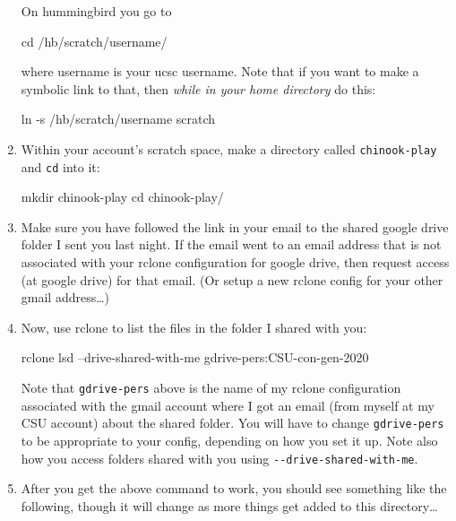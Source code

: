 \documentclass[]{krantz}
\makeatletter
\newenvironment{Shaded}{\begin{snugshade}}{\end{snugshade}}
\newcommand{\BuiltInTok}[1]{#1}
\newcommand{\ExtensionTok}[1]{#1}
\newcommand{\FunctionTok}[1]{\textcolor[rgb]{0,0,0}{#1}}
\newcommand{\NormalTok}[1]{#1}
\newenvironment{kframe}{%
\medskip{}
\setlength{\fboxsep}{.8em}
 \def\at@end@of@kframe{}%
 \ifinner\ifhmode%
  \def\at@end@of@kframe{\end{minipage}}%
  \begin{minipage}{\columnwidth}%
 \fi\fi%
 \def\FrameCommand##1{\hskip\@totalleftmargin \hskip-\fboxsep
 \colorbox{shadecolor}{##1}\hskip-\fboxsep
     \hskip-\linewidth \hskip-\@totalleftmargin \hskip\columnwidth}%
 \MakeFramed {\advance\hsize-\width
   \@totalleftmargin\z@ \linewidth\hsize
   \@setminipage}}%
 {\par\unskip\endMakeFramed%
 \at@end@of@kframe}
\renewenvironment{Shaded}{\begin{kframe}}{\end{kframe}}
\makeatother
\begin{document}
\begin{enumerate}
  On hummingbird you go to

\begin{Shaded}
\begin{Highlighting}[]
\BuiltInTok{cd}\NormalTok{ /hb/scratch/username/}
\end{Highlighting}
\end{Shaded}

  where username is your ucsc username. Note that if you want to make a symbolic link to that, then
  \emph{while in your home directory} do this:

\begin{Shaded}
\begin{Highlighting}[]
\FunctionTok{ln}\NormalTok{ -s /hb/scratch/username scratch}
\end{Highlighting}
\end{Shaded}
\item
  Within your account's scratch space, make a directory called \texttt{chinook-play} and \texttt{cd} into it:

\begin{Shaded}
\begin{Highlighting}[]
\FunctionTok{mkdir}\NormalTok{ chinook-play}
\BuiltInTok{cd}\NormalTok{ chinook-play/}
\end{Highlighting}
\end{Shaded}
\item
  Make sure you have followed the link in your email to the shared google drive folder I sent you last night. If the email
  went to an email address that is not associated with your rclone configuration for google drive, then request access
  (at google drive) for that email. (Or setup a new rclone config for your other gmail address\ldots{})
\item
  Now, use rclone to list the files in the folder I shared with you:

\begin{Shaded}
\begin{Highlighting}[]
\ExtensionTok{rclone}\NormalTok{ lsd --drive-shared-with-me gdrive-pers:CSU-con-gen-2020}
\end{Highlighting}
\end{Shaded}

  Note that \texttt{gdrive-pers} above is the name of my rclone configuration associated with the gmail account where
  I got an email (from myself at my CSU account) about the shared folder. You will have to change \texttt{gdrive-pers}
  to be appropriate to your config, depending on how you set it up. Note also how you access folders shared with
  you using \texttt{-\/-drive-shared-with-me}.
\item
  After you get the above command to work, you should see something like the following, though it
  will change as more things get added to this directory\ldots{}


\end{enumerate}
\end{document}
